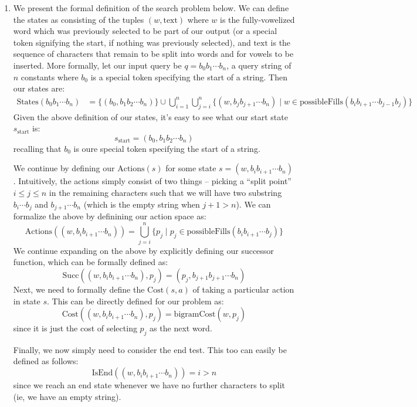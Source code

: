 \documentclass[12pt]{article}
\begin{document}
\begin{enumerate}[label=(\alph*)]
  \item We present the formal definition of the search problem below. We can define the states as consisting of the tuples $(w, \text{text})$ where $w$ is the fully-vowelized word which was previously selected to be part of our output (or a special token signifying the start, if nothing was previously selected), and $\text{text}$ is the sequence of characters that remain to be split into words and for vowels to be inserted. More formally, let our input query be $q = b_0b_1 \cdots b_n$, a query string of $n$ constants where $b_0$ is a special token specifying the start of a string. Then our states are:
  \begin{align*}
    \text{States}(b_0b_1 \cdots b_n) &= \{(b_0, b_1b_2\cdots b_n) \} \cup \bigcup_{i=1}^n
    \bigcup_{j=i}^n \{(w, b_jb_{j+1}\cdots b_{n}) \mid w \in \text{possibleFills}(b_ib_{i+1}\cdots b_{j-1} b_j)\}
  \end{align*}
  Given the above definition of our states, it's easy to see what our start state $s_{\text{start}}$ is:
  $$
    s_{\text{start}} = (b_0, b_1b_2 \cdots b_n)
  $$
  recalling that $b_0$ is oure special token specifying the start of a string.

  We continue by defining our $\text{Actions}(s)$ for some state $s = (w, b_ib_{i+1} \cdots b_n)$. Intuitively, the actions simply consist of two things -- picking a ``split point'' $i \leq j \leq n$ in the remaining characters such that we will have two substring $b_i \cdots b_j$ and $b_{j+1}\cdots b_{n}$ (which is the empty string when $j + 1 >  n$). We can formalize the above by definining our action space as:
  $$
    \text{Actions}((w, b_ib_{i+1} \cdots b_n)) = \bigcup_{j=i}^n \{p_j \mid p_j \in \text{possibleFills}(b_ib_{i+1}\cdots b_{j})\}
  $$
  We continue expanding on the above by explicitly defining our successor function, which can be formally defined as:
  $$
    \text{Succ}((w, b_ib_{i+1} \cdots b_n), p_j) = (p_j, b_{j+1}b_{j+1}\cdots b_n)
  $$
  Next, we need to formally define the $\text{Cost}(s, a)$ of taking a particular action in state $s$. This can be directly defined for our problem as:
  $$
    \text{Cost}((w, b_ib_{i+1} \cdots b_n), p_j) = \text{bigramCost}(w, p_j)
  $$
  since it is just the cost of selecting $p_j$ as the next word.

  Finally, we now simply need to consider the end test. This too can easily be defined as follows:
  $$
    \text{IsEnd}((w, b_ib_{i+1} \cdots b_n)) = i > n
  $$
  since we reach an end state whenever we have no further characters to split (ie, we have an empty string).


\end{enumerate}
\end{document}
